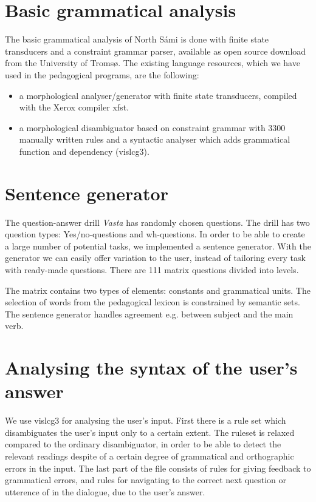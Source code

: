 \documentclass[11pt]{article}
\begin{document}
\section{Basic grammatical analysis}
The basic grammatical analysis of North Sámi is done with finite state transducers and a constraint grammar parser, available as open source download from the University of Tromsø. The existing language resources, which we have used in the pedagogical programs, are the following:

\begin{itemize}
\item a morphological analyser/generator with finite state transducers, compiled with the Xerox compiler xfst.  
\item a morphological disambiguator based on constraint grammar with 3300 manually written rules and a syntactic analyser which adds grammatical function and dependency (vislcg3). 
\end{itemize}


\section{Sentence generator}
The question-answer drill \textit{Vasta} has randomly chosen questions. The drill has two question types: Yes/no-questions and wh-questions. In order to be able to create a large number of potential tasks, we implemented a sentence generator. With the generator we can easily offer variation to the user, instead of tailoring every task with ready-made questions. There are 111 matrix questions divided into levels.

The matrix contains two types of elements: constants and grammatical units. The selection of words from the pedagogical lexicon is constrained by semantic sets. The sentence generator handles agreement e.g. between subject and the main verb.
 
\section{Analysing the syntax of the user's answer} 
We use vislcg3 for analysing the user's input. First there is a rule set which disambiguates the user's input only to a certain extent. The ruleset is relaxed compared to the ordinary disambiguator, in order to be able to detect the relevant readings despite of a certain degree of  grammatical and orthographic errors in the input. The last part of the file consists of rules for giving feedback to grammatical errors, and rules for navigating to the correct next question or utterence of in the dialogue, due to the user's answer.  
\end{document}
